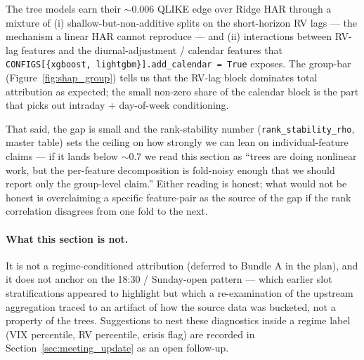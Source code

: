 The tree models earn their $\sim$$0.006$ QLIKE edge over Ridge HAR
through a mixture of (i) shallow-but-non-additive splits on the
short-horizon RV lags --- the mechanism a linear HAR cannot reproduce
--- and (ii) interactions between RV-lag features and the
diurnal-adjustment / calendar features that
\texttt{CONFIGS[\{xgboost,\,lightgbm\}].add\_calendar = True}
exposes. The group-bar (Figure~\ref{fig:shap_group}) tells us that
the RV-lag block dominates total attribution as expected; the small
non-zero share of the calendar block is the part that picks out
intraday + day-of-week conditioning.

That said, the gap is small and the rank-stability number
(\texttt{rank\_stability\_rho}, master table) sets the ceiling on
how strongly we can lean on individual-feature claims --- if it lands
below $\sim$0.7 we read this section as ``trees are doing nonlinear
work, but the per-feature decomposition is fold-noisy enough that we
should report only the group-level claim.'' Either reading is
honest; what would not be honest is overclaiming a specific
feature-pair as the source of the gap if the rank correlation
disagrees from one fold to the next.

\paragraph{What this section is not.} It is not a regime-conditioned
attribution (deferred to Bundle A in the plan), and it does not
anchor on the 18:30 / Sunday-open pattern --- which earlier slot
stratifications appeared to highlight but which a re-examination of
the upstream aggregation traced to an artifact of how the source
data was bucketed, not a property of the trees. Suggestions to
nest these diagnostics inside a regime label (VIX percentile, RV
percentile, crisis flag) are recorded in
Section~\ref{sec:meeting_update} as an open follow-up.
